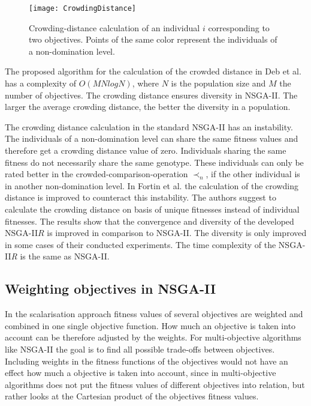     \begin{figure}
        \centering
        \texttt{[image: CrowdingDistance]}
        \caption{Crowding-distance calculation of an individual $i$ corresponding to two objectives. Points of the same color represent the individuals of a non-domination level.}
        \label{fig:crowdingDistance}
    \end{figure}
    
    The proposed algorithm for the calculation of the crowded distance in Deb et al.\cite{Deb:2002} has a complexity of $O(MN logN)$, where $N$ is the population size and $M$ the number of objectives. The crowding distance ensures diversity in NSGA-II. The larger the average crowding distance, the better the diversity in a population.
    
    
    The crowding distance calculation in the standard NSGA-II\cite{Deb:2002} has an instability. The individuals of a non-domination level can share the same fitness values and therefore get a crowding distance value of zero. Individuals sharing the same fitness do not necessarily share the same genotype. These individuals can only be rated better in the crowded-comparison-operation $\prec_n$, if the other individual is in another non-domination level. In Fortin et al.\cite{Fortin:2013} the calculation of the crowding distance is improved to counteract this instability. The authors suggest to calculate the crowding distance on basis of unique fitnesses instead of individual fitnesses. The results show that the convergence and diversity of the developed NSGA-II$R$ is improved in comparison to NSGA-II. The diversity is only improved in some cases of their conducted experiments. The time complexity of the NSGA-II\textit{R} is the same as NSGA-II.
    
    \subsection{Weighting objectives in NSGA-II}
    \label{sec:weightedNSGA2}
    In the scalarisation approach fitness values of several objectives are weighted and combined in one single objective function. How much an objective is taken into account can be therefore adjusted by the weights. For multi-objective algorithms like NSGA-II the goal is to find all possible trade-offs between objectives. Including weights in the fitness functions of the objectives would not have an effect how much a objective is taken into account, since in multi-objective algorithms does not put the fitness values of different objectives into relation, but rather looks at the Cartesian product of the objectives fitness values.
    
